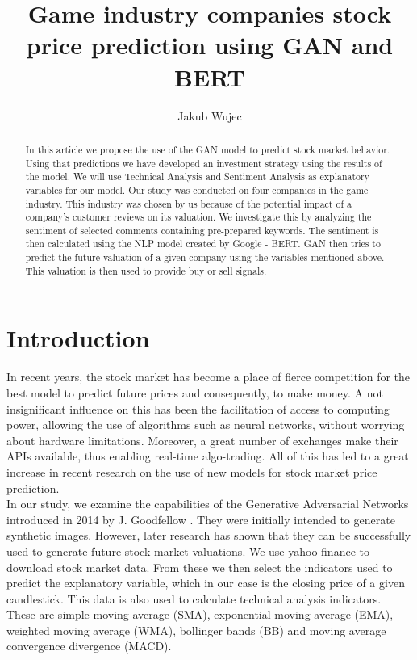 \documentclass[11pt]{article} %
\title{Game industry companies stock price prediction using GAN and BERT}
\author{Jakub Wujec}
\begin{document}
\maketitle


\begin{abstract} In this article we propose the use of the GAN model to predict stock market behavior. Using that predictions we have developed an investment strategy using the results of the model. We will use Technical Analysis and Sentiment Analysis as explanatory variables for our model. Our study was conducted on four companies in the game industry. This industry was chosen by us because of the potential impact of a company's customer reviews on its valuation. We investigate this by analyzing the sentiment of selected comments containing pre-prepared keywords. The sentiment is then calculated using the NLP model created by Google - BERT. GAN then tries to predict the future valuation of a given company using the variables mentioned above. This valuation is then used to provide buy or sell signals.  
\end{abstract}

\section{Introduction}
In recent years, the stock market has become a place of fierce competition for the best model to predict future prices and consequently, to make money. 
A not insignificant influence on this has been the facilitation of access to computing power, allowing the use of algorithms such as neural networks, without worrying about hardware limitations. Moreover, a great number of exchanges make their APIs available, thus enabling real-time algo-trading. All of this has led to a great increase in recent research on the use of new models for stock market price prediction.  \\

In our study, we examine the capabilities of the Generative Adversarial Networks introduced in 2014 by J. Goodfellow \cite{gan1}. They were initially intended to generate synthetic images. However, later research has shown that they can be successfully used to generate future stock market valuations. We use yahoo finance to download stock market data. From these we then select the indicators used to predict the explanatory variable, which in our case is the closing price of a given candlestick. This data is also used to calculate technical analysis indicators. These are simple moving average (SMA), exponential moving average (EMA), weighted moving average (WMA), bollinger bands (BB) and moving average convergence divergence (MACD). \\
\end{document}
